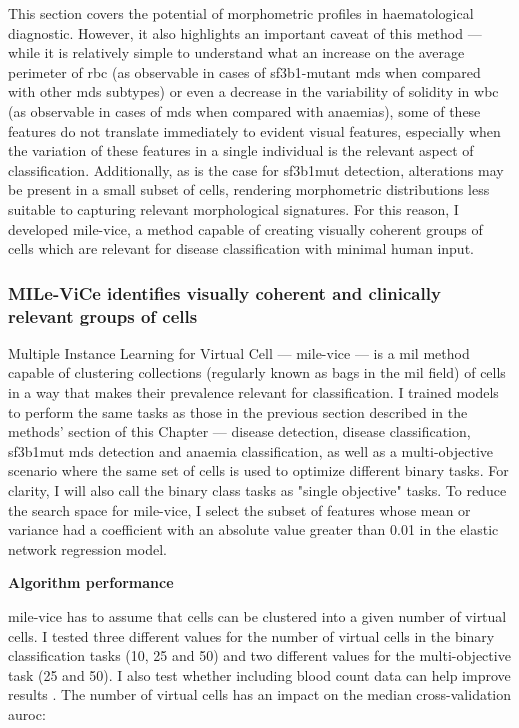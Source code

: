 This section covers the potential of morphometric profiles in haematological diagnostic. However, it also highlights an important caveat of this method --- while it is relatively simple to understand what an increase on the average perimeter of \ac{rbc} (as observable in cases of \ac{sf3b1}-mutant \ac{mds} when compared with other \ac{mds} subtypes) or even a decrease in the variability of solidity in \ac{wbc} (as observable in cases of \ac{mds} when compared with anaemias), some of these features do not translate immediately to evident visual features, especially when the variation of these features in a single individual is the relevant aspect of classification. Additionally, as is the case for \ac{sf3b1}mut detection, alterations may be present in a small subset of cells, rendering morphometric distributions less suitable to capturing relevant morphological signatures. For this reason, I developed \ac{mile-vice}, a method capable of creating visually coherent groups of cells which are relevant for disease classification with minimal human input.

\subsubsection{MILe-ViCe identifies visually coherent and clinically relevant groups of cells}

Multiple Instance Learning for Virtual Cell --- \ac{mile-vice} --- is a \ac{mil} method capable of clustering collections (regularly known as bags in the \ac{mil} field) of cells in a way that makes their prevalence relevant for classification. I trained models to perform the same tasks as those in the previous section described in the methods' section of this Chapter ---  disease detection, disease classification, \ac{sf3b1}mut \ac{mds} detection and anaemia classification, as well as a multi-objective scenario where the same set of cells is used to optimize different binary tasks. For clarity, I will also call the binary class tasks as "single objective" tasks. To reduce the search space for \ac{mile-vice}, I select the subset of features whose mean or variance had a coefficient with an absolute value greater than 0.01 in the elastic network regression model.

\noindent \textbf{Algorithm performance}

\ac{mile-vice} has to assume that cells can be clustered into a given number of virtual cells. I tested three different values for the number of virtual cells in the binary classification tasks (10, 25 and 50) and two different values for the multi-objective task (25 and 50). I also test whether including blood count data can help improve results . The number of virtual cells has an impact on the median cross-validation \ac{auroc}:

